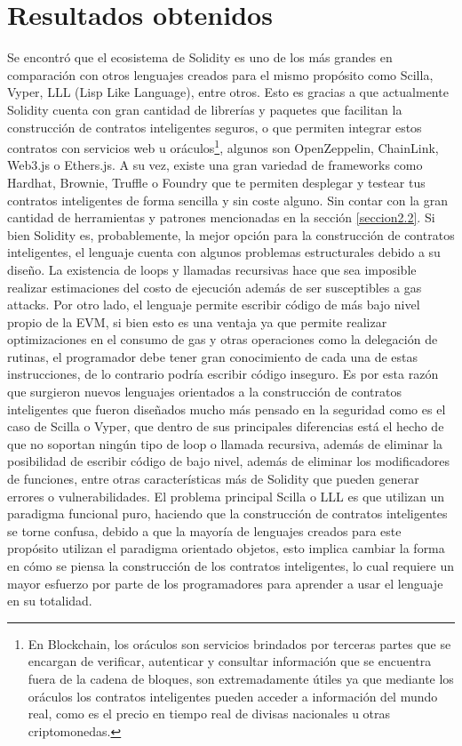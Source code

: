 \documentclass[a4paper,10pt]{article}
\begin{document}
	\section{Resultados obtenidos}
	Se encontró que el ecosistema de Solidity es uno de los más grandes en comparación con otros lenguajes creados para el mismo propósito como Scilla, Vyper, LLL (Lisp Like Language), entre otros. Esto es gracias a que actualmente Solidity cuenta con gran cantidad de librerías y paquetes que facilitan la construcción de contratos inteligentes seguros, o que permiten integrar estos contratos con servicios web u oráculos\footnote{En Blockchain, los oráculos son servicios brindados por terceras partes que se encargan de verificar, autenticar y consultar información que se encuentra fuera de la cadena de bloques, son extremadamente útiles ya que mediante los oráculos los contratos inteligentes pueden acceder a información del mundo real, como es el precio en tiempo real de divisas nacionales u otras criptomonedas.}, algunos son OpenZeppelin, ChainLink, Web3.js o Ethers.js. A su vez, existe una gran variedad de frameworks como Hardhat, Brownie, Truffle o Foundry que te permiten desplegar y testear tus contratos inteligentes de forma sencilla y sin coste alguno. Sin contar con la gran cantidad de herramientas y patrones mencionadas en la sección \ref{seccion2.2}. Si bien Solidity es, probablemente, la mejor opción para la construcción de contratos inteligentes, el lenguaje cuenta con algunos problemas estructurales debido a su diseño. La existencia de loops y llamadas recursivas hace que sea imposible realizar estimaciones del costo de ejecución además de ser susceptibles a gas attacks. Por otro lado, el lenguaje permite escribir código de más bajo nivel propio de la EVM, si bien esto es una ventaja ya que permite realizar optimizaciones en el consumo de gas y otras operaciones como la delegación de rutinas, el programador debe tener gran conocimiento de cada una de estas instrucciones, de lo contrario podría escribir código inseguro. Es por esta razón que surgieron nuevos lenguajes orientados a la construcción de contratos inteligentes que fueron diseñados mucho más pensado en la seguridad como es el caso de Scilla o Vyper, que dentro de sus principales diferencias está el hecho de que no soportan ningún tipo de loop o llamada recursiva, además de eliminar la posibilidad de escribir código de bajo nivel, además de eliminar los modificadores de funciones, entre otras características más de Solidity que pueden generar errores o vulnerabilidades. El problema principal Scilla o LLL es que utilizan un paradigma funcional puro, haciendo que la construcción de contratos inteligentes se torne confusa, debido a que la mayoría de lenguajes creados para este propósito utilizan el paradigma orientado objetos, esto implica cambiar la forma en cómo se piensa la construcción de los contratos inteligentes, lo cual requiere un mayor esfuerzo por parte de los programadores para aprender a usar el lenguaje en su totalidad.
	
\end{document}
